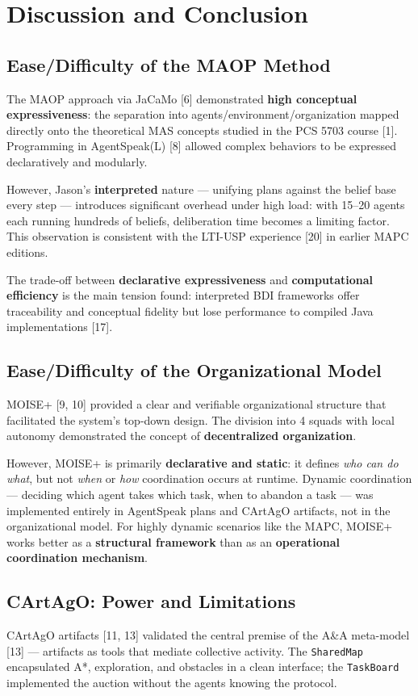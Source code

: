 \documentclass[11pt,a4paper]{article}
\newcommand{\code}[1]{\texttt{#1}}
\begin{document}
\section{Discussion and Conclusion}

\subsection{Ease/Difficulty of the MAOP Method}
The MAOP approach via JaCaMo [6] demonstrated \textbf{high conceptual expressiveness}: the separation into agents/environment/organization mapped directly onto the theoretical MAS concepts studied in the PCS 5703 course [1]. Programming in AgentSpeak(L) [8] allowed complex behaviors to be expressed declaratively and modularly.

However, Jason's \textbf{interpreted} nature --- unifying plans against the belief base every step --- introduces significant overhead under high load: with 15--20 agents each running hundreds of beliefs, deliberation time becomes a limiting factor. This observation is consistent with the LTI-USP experience [20] in earlier MAPC editions.

The trade-off between \textbf{declarative expressiveness} and \textbf{computational efficiency} is the main tension found: interpreted BDI frameworks offer traceability and conceptual fidelity but lose performance to compiled Java implementations [17].

\subsection{Ease/Difficulty of the Organizational Model}
MOISE+ [9, 10] provided a clear and verifiable organizational structure that facilitated the system's top-down design. The division into 4 squads with local autonomy demonstrated the concept of \textbf{decentralized organization}.

However, MOISE+ is primarily \textbf{declarative and static}: it defines \emph{who can do what}, but not \emph{when} or \emph{how} coordination occurs at runtime. Dynamic coordination --- deciding which agent takes which task, when to abandon a task --- was implemented entirely in AgentSpeak plans and CArtAgO artifacts, not in the organizational model. For highly dynamic scenarios like the MAPC, MOISE+ works better as a \textbf{structural framework} than as an \textbf{operational coordination mechanism}.

\subsection{CArtAgO: Power and Limitations}
CArtAgO artifacts [11, 13] validated the central premise of the A\&A meta-model [13] --- artifacts as tools that mediate collective activity. The \code{SharedMap} encapsulated A*, exploration, and obstacles in a clean interface; the \code{TaskBoard} implemented the auction without the agents knowing the protocol.
\end{document}
